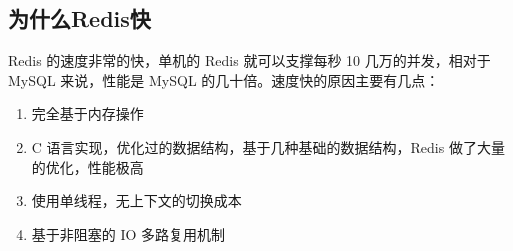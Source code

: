 \documentclass[../../../interview-questions.tex]{subfiles}
\begin{document}
\subsection{为什么Redis快}

Redis 的速度非常的快，单机的 Redis 就可以支撑每秒 10 几万的并发，相对于 MySQL 来说，性能是 MySQL 的几十倍。速度快的原因主要有几点：

\begin{enumerate}
    \item {完全基于内存操作}
    \item {C 语言实现，优化过的数据结构，基于几种基础的数据结构，Redis 做了大量的优化，性能极高}
    \item {使用单线程，无上下文的切换成本}
    \item {基于非阻塞的 IO 多路复用机制}
\end{enumerate}
\end{document}
